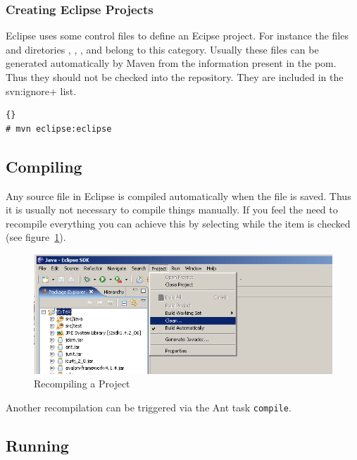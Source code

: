 \subsubsection{Creating Eclipse Projects}

Eclipse uses some control files to define an Ecipse project. For
instance the files and diretories , ,
, and  belong to this category.
Usually these files can be generated automatically by Maven from the
information present in the pom. Thus they should not be checked into
the repository. They are included in the \+svn:ignore+ list.


\begin{lstlisting}{}
# mvn eclipse:eclipse
\end{lstlisting}

\Incomplete


\subsection{Compiling \ExTeX}

Any source file in Eclipse is compiled automatically when the file is
saved. Thus it is usually not necessary to compile things manually. If
you feel the need to recompile everything you can achieve this by
selecting  while the item  is checked (see
figure~\ref{fig:eclipse-recompile}).
\begin{figure}[thp]
  \centering
  \includegraphics[scale=.4]{image/eclipse/recompile}
  \caption{Recompiling a Project}\label{fig:eclipse-recompile}
\end{figure}

Another recompilation can be triggered via the Ant task \texttt{compile}.

\subsection{Running \ExTeX}

